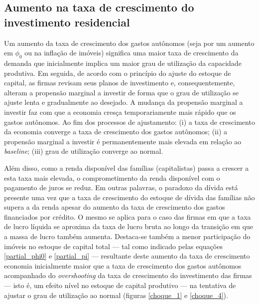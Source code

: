 \subsection*{Aumento na taxa de crescimento do investimento residencial}


Um aumento da taxa de crescimento dos gastos autônomos (seja por um aumento em $\phi_0$ ou na inflação de imóveis) significa uma maior taxa de crescimento da demanda que inicialmente implica um maior grau de utilização da capacidade produtiva. Em seguida, de acordo com o princípio do ajuste do estoque de capital, as firmas revisam seus planos de investimento e, consequentemente, alteram a propensão marginal a investir de forma que o grau de utilização se ajuste lenta e gradualmente ao desejado. A mudança da propensão marginal a investir faz com que  a economia cresça temporariamente mais rápido que os gastos autônomos. Ao fim dos processos de ajustamento: (i) a taxa de crescimento da economia converge a taxa de crescimento dos gastos autônomos; (ii) a propensão marginal a investir é permanentemente mais elevada em relação ao \textit{baseline}; (iii) grau de utilização converge ao normal.


Além disso, como a renda disponível das famílias (capitalistas) passa a crescer a esta taxa mais elevada, o comprometimento da renda disponível com o pagamento de juros se reduz. 
Em outras palavras, o paradoxo da dívida está presente 
uma vez que a taxa de crescimento do estoque de dívida das famílias não supera a da renda apesar do aumento da taxa de crescimento dos gastos financiados por crédito. O mesmo se aplica para o caso das firmas em que a taxa de lucro líquida se aproxima da taxa de lucro bruta ao longo da transição em que a massa de lucro também aumenta. 
Destaca-se também a menor participação do imóveis no estoque de capital total --- tal como indicado pelas equações \ref{partial_phi0} e \ref{partial_pi} --- resultante deste aumento da taxa de crescimento economia inicialmente maior que a taxa de crescimento dos gastos autônomos acompanhado do \textit{overshooting} da taxa de crescimento do investimento das firmas --- isto é, um efeito nível no estoque de capital produtivo --- na tentativa de ajustar o grau de utilização ao normal (figuras \ref{choque_1} e \ref{choque_4}).


